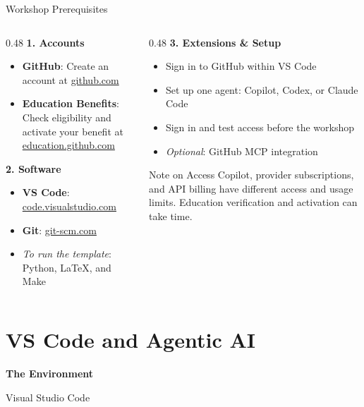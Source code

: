 \documentclass[11pt,aspectratio=169]{beamer}
\begin{document}
\begin{frame}{Workshop Prerequisites}
\begin{columns}[t]
\begin{column}{0.48\textwidth}
\textbf{1. Accounts}
\begin{itemize}
    \item \textbf{GitHub}: Create an account at \url{github.com}
    \item \textbf{Education Benefits}: Check eligibility and activate your benefit at \url{education.github.com}
\end{itemize}
\vspace{0.2cm}
\textbf{2. Software}
\begin{itemize}
    \item \textbf{VS Code}: \url{code.visualstudio.com}
    \item \textbf{Git}: \url{git-scm.com}
    \item \textit{To run the template}: Python, LaTeX, and Make
\end{itemize}
\end{column}
\begin{column}{0.48\textwidth}
\textbf{3. Extensions \& Setup}
\begin{itemize}
    \item Sign in to GitHub within VS Code
    \item Set up one agent: Copilot, Codex, or Claude Code
    \item Sign in and test access before the workshop
    \item \textit{Optional}: GitHub MCP integration
\end{itemize}
\vspace{0.2cm}
\begin{block}{Note on Access}
Copilot, provider subscriptions, and API billing have different access and usage limits. Education verification and activation can take time.
\end{block}
\end{column}
\end{columns}
\end{frame}


\section{VS Code and Agentic AI}

\begin{frame}[plain]
    \centering
    \vspace{1cm}
    \textbf{\Huge The Environment}

    \vspace{0.5cm}
    {\Large Visual Studio Code}

    \vspace{1.5cm}
\end{frame}
\end{document}
